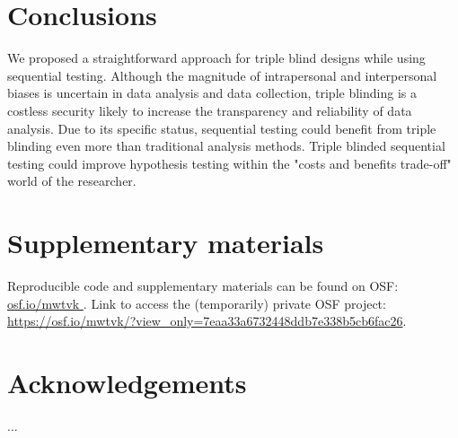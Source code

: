 \documentclass[a4paper,man,natbib,floatsintext,donotrepeattitle]{apa6}
\begin{document}
\section{Conclusions}


We proposed a straightforward approach for triple blind designs while using sequential testing. Although the magnitude of intrapersonal and interpersonal biases is uncertain in data analysis and data collection, triple blinding is a costless security likely to increase the transparency and reliability of data analysis. Due to its specific status, sequential testing could benefit from triple blinding even more than traditional analysis methods. Triple blinded sequential testing could improve hypothesis testing within the "costs and benefits trade-off" world of the researcher.

\section{Supplementary materials}\label{sec:supp}

Reproducible code and supplementary materials can be found on OSF: \url{osf.io/mwtvk
}. Link to access the (temporarily) private OSF project: \url{https://osf.io/mwtvk/?view_only=7eaa33a6732448ddb7e338b5cb6fac26}.

\section{Acknowledgements}

...


\end{document}
